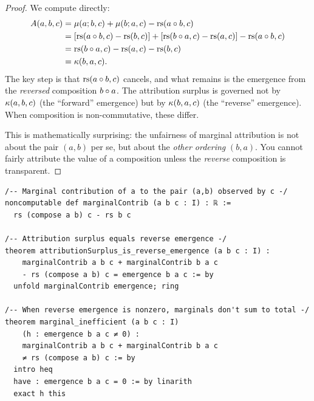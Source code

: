 \begin{proof}
We compute directly:
\begin{align*}
A(a, b, c) &= \mu(a; b, c) + \mu(b; a, c) - \mathrm{rs}(a \circ b, c) \\
&= [\mathrm{rs}(a \circ b, c) - \mathrm{rs}(b, c)] + [\mathrm{rs}(b \circ a, c) - \mathrm{rs}(a, c)]
   - \mathrm{rs}(a \circ b, c) \\
&= \mathrm{rs}(b \circ a, c) - \mathrm{rs}(a, c) - \mathrm{rs}(b, c) \\
&= \kappa(b, a, c).
\end{align*}
The key step is that $\mathrm{rs}(a \circ b, c)$ cancels, and what remains is
the emergence from the \emph{reversed} composition $b \circ a$. The
attribution surplus is governed not by $\kappa(a, b, c)$ (the ``forward''
emergence) but by $\kappa(b, a, c)$ (the ``reverse'' emergence). When
composition is non-commutative, these differ.

This is mathematically surprising: the unfairness of marginal attribution
is not about the pair $(a, b)$ per se, but about the \emph{other ordering}
$(b, a)$. You cannot fairly attribute the value of a composition unless
the \emph{reverse} composition is transparent.
\end{proof}

\begin{lstlisting}[caption={Lean 4: Attribution impossibility}]
/-- Marginal contribution of a to the pair (a,b) observed by c -/
noncomputable def marginalContrib (a b c : I) : ℝ :=
  rs (compose a b) c - rs b c

/-- Attribution surplus equals reverse emergence -/
theorem attributionSurplus_is_reverse_emergence (a b c : I) :
    marginalContrib a b c + marginalContrib b a c
    - rs (compose a b) c = emergence b a c := by
  unfold marginalContrib emergence; ring

/-- When reverse emergence is nonzero, marginals don't sum to total -/
theorem marginal_inefficient (a b c : I)
    (h : emergence b a c ≠ 0) :
    marginalContrib a b c + marginalContrib b a c
    ≠ rs (compose a b) c := by
  intro heq
  have : emergence b a c = 0 := by linarith
  exact h this
\end{lstlisting}

